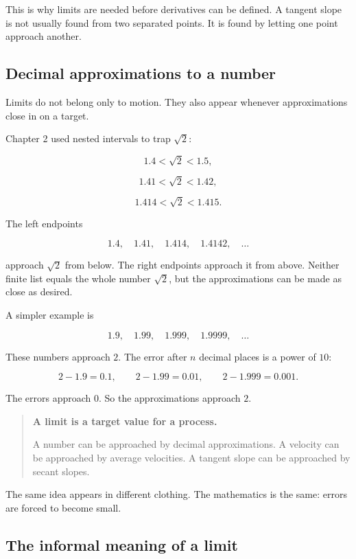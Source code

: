 This is why limits are needed before derivatives can be defined.  A tangent slope is not usually found from two separated points.  It is found by letting one point approach another.

\subsection{Decimal approximations to a number}
\label{subsec:decimal-approximations-limit}

Limits do not belong only to motion.  They also appear whenever approximations close in on a target.

Chapter 2 used nested intervals to trap \(\sqrt2\):

\[
1.4<\sqrt2<1.5,
\]

\[
1.41<\sqrt2<1.42,
\]

\[
1.414<\sqrt2<1.415.
\]

The left endpoints

\[
1.4,\quad 1.41,\quad 1.414,\quad 1.4142,\quad \ldots
\]

approach \(\sqrt2\) from below.  The right endpoints approach it from above.  Neither finite list equals the whole number \(\sqrt2\), but the approximations can be made as close as desired.

A simpler example is

\[
1.9,\quad 1.99,\quad 1.999,\quad 1.9999,\quad \ldots
\]

These numbers approach \(2\).  The error after \(n\) decimal places is a power of \(10\):

\[
2-1.9=0.1,\qquad
2-1.99=0.01,\qquad
2-1.999=0.001.
\]

The errors approach \(0\).  So the approximations approach \(2\).

\begin{quote}
\textbf{A limit is a target value for a process.}

A number can be approached by decimal approximations.  A velocity can be approached by average velocities.  A tangent slope can be approached by secant slopes.
\end{quote}

The same idea appears in different clothing.  The mathematics is the same: errors are forced to become small.

\subsection{The informal meaning of a limit}
\label{subsec:informal-limit-meaning}

